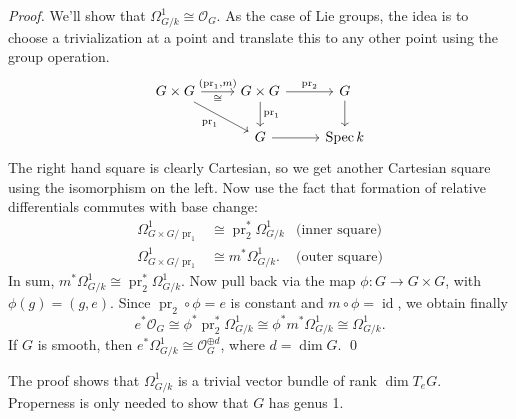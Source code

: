 \textit{Proof.} We'll show that \( \Omega^1_{G/k} \cong \mathcal{O}_G \).
As the case of Lie groups, the idea is to choose a trivialization at a point and translate this to any other point using the group operation.
\[
\begin{tikzcd}
  G \times G \arrow[r,"\cong"',"{( \operatorname{pr}_1, m )}"] \arrow[dr,"{\operatorname{pr}_1}"'] & G \times G \arrow[r,"{\operatorname{pr}_2}"] \arrow[d,"{\operatorname{pr}_1}"] & G \arrow[d] \\
  & G \arrow[r] & \operatorname{Spec} k
\end{tikzcd}
\]
The right hand square is clearly Cartesian, so we get another Cartesian square using the isomorphism on the left. Now use the fact that formation of relative differentials commutes with base change:
\begin{align*}
  \Omega^1_{G \times G / \operatorname{pr}_1 } & \cong \operatorname{pr}_2^* \Omega^1_{G/k} & \mbox{(inner square)} \\
  \Omega^1_{G \times G / \operatorname{pr}_1} & \cong m^* \Omega^1_{G/k} . & \mbox{(outer square)}
\end{align*}
In sum, \( m^* \Omega^1_{G/k} \cong \operatorname{pr}_2^* \Omega^1_{G/k} \).
Now pull back via the map \( \phi \colon G \to G \times G \), with \( \phi(g) = (g,e) \).
Since \( \operatorname{pr}_2 \circ \phi = e \) is constant and \( m \circ \phi = \operatorname{id} \), we obtain finally
\[ e^* \mathcal{O}_G \cong \phi^* \operatorname{pr}_2^* \Omega^1_{G/k} \cong \phi^* m^* \Omega^1_{G/k} \cong \Omega^1_{G/k} . \]
If \( G \) is smooth, then  \( e^* \Omega^1_{G/k} \cong \mathcal{O}_G^{\oplus d} \), where \( d = \operatorname{dim} G \).
\qed
\begin{remark}
  The proof shows that \( \Omega_{G/k}^1 \) is a trivial vector bundle of rank \( \operatorname{dim}T_e G \).
  Properness is only needed to show that \( G \) has genus 1.
\end{remark}
